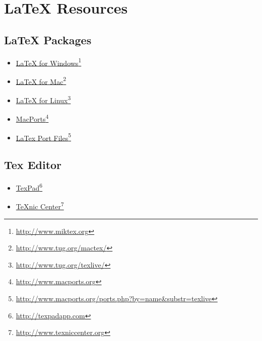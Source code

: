 
\section{LaTeX Resources}

\subsection{LaTeX Packages}
\label{latexpackages}

\begin{itemize}
\item \href{http://www.miktex.org}{LaTeX for Windows}\footnote{\href{http://www.miktex.org}{http:/\slash www.miktex.org}}

\item \href{http://www.tug.org/mactex/}{LaTeX for Mac}\footnote{\href{http://www.tug.org/mactex/}{http:/\slash www.tug.org\slash mactex\slash }}

\item \href{http://www.tug.org/texlive/}{LaTeX for Linux}\footnote{\href{http://www.tug.org/texlive/}{http:/\slash www.tug.org\slash texlive\slash }}

\item \href{http://www.macports.org}{MacPorts}\footnote{\href{http://www.macports.org}{http:/\slash www.macports.org}}

\item \href{http://www.macports.org/ports.php?by=name&substr=texlive}{LaTex Port Files}\footnote{\href{http://www.macports.org/ports.php?by=name&substr=texlive}{http:/\slash www.macports.org\slash ports.php?by=name\&substr=texlive}}

\end{itemize}

\subsection{Tex Editor}
\label{texeditor}

\begin{itemize}
\item \href{http://texpadapp.com}{TexPad}\footnote{\href{http://texpadapp.com}{http:/\slash texpadapp.com}}

\item \href{http://www.texniccenter.org}{TeXnic Center}\footnote{\href{http://www.texniccenter.org}{http:/\slash www.texniccenter.org}}

\end{itemize}

